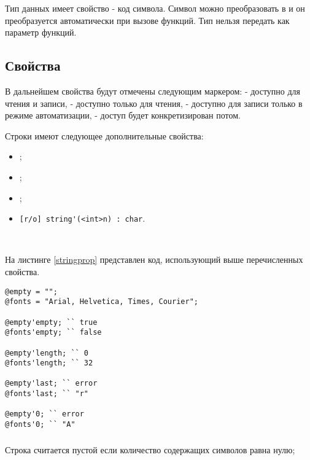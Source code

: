 \documentclass[a4paper, 14pt]{extarticle}
\newenvironment{icItems}
	{ \begin{itemize} [noitemsep,nolistsep] }
	{ \end{itemize} }
\begin{document}
Тип данных \chartype{} имеет свойство  - код символа. Символ можно преобразовать в \str{} и он преобразуется автоматически при вызове функций. Тип \chartype{} нельзя передать как параметр функций.

\subsection{Свойства}

В дальнейшем свойства будут отмечены следующим маркером: \code{[r/w]} - доступно для чтения и записи, \code{[r/o]} - доступно только для чтения,  \code{[r/*]} - доступно для записи только в режиме автоматизации, \code{[*/*]} - доступ будет конкретизирован потом.

Строки имеют следующее дополнительные свойства:
\begin{icItems}
\item
	;
\item
	;
\item
	;
\item
	\lstinline|[r/o] string'(<int>n) : char|.
\end{icItems}

\

На листинге \ref{stringprop} представлен код, использующий выше перечисленных свойства.

\begin{lstlisting}[caption=Свойства класса string, label=stringprop]
@empty = "";
@fonts = "Arial, Helvetica, Times, Courier";

@empty'empty; `` true
@fonts'empty; `` false

@empty'length; `` 0
@fonts'length; `` 32

@empty'last; `` error
@fonts'last; `` "r"

@empty'0; `` error
@fonts'0; `` "A"
\end{lstlisting}

\subsubsection{}

Строка считается пустой если количество содержащих символов равна нулю;

\subsubsection{}
\end{document}
